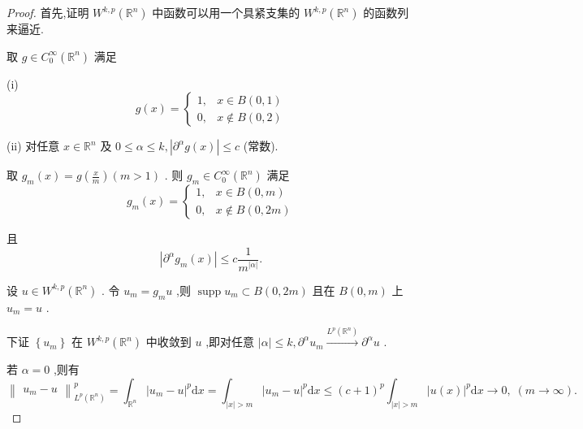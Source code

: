\documentclass[lang=cn,newtx,10pt,scheme=chinese,thmcnt=chapter]{elegantbook}
\newcommand{\dif}{\mathrm{d}}
\begin{document}
\begin{proof}
    首先,证明 \({W}^{k,p}\left( {\mathbb{R}}^{n}\right)\) 中函数可以用一个具紧支集的 \({W}^{k,p}\left( {\mathbb{R}}^{n}\right)\) 的函数列来逼近.

取 \(g \in  {C}_{0}^{\infty }\left( {\mathbb{R}}^{n}\right)\) 满足

(i)
\begin{equation*}
g\left( x\right)  = \left\{  \begin{array}{ll} 1, & x \in  B\left( {0,1}\right) \\  0, & x \notin  B\left( {0,2}\right)  \end{array}\right.
\end{equation*}

(ii) 对任意 \(x \in  {\mathbb{R}}^{n}\) 及 \(0 \leqslant  \alpha  \leqslant  k,\left| {{\partial }^{\alpha }g\left( x\right) }\right|  \leqslant  c\) (常数).

取 \({g}_{m}\left( x\right)  = g\left( \frac{x}{m}\right) \left( {m > 1}\right)\) . 则 \({g}_{m} \in  {C}_{0}^{\infty }\left( {\mathbb{R}}^{n}\right)\) 满足
\begin{equation*}
{g}_{m}\left( x\right)  = \left\{  \begin{array}{ll} 1, & x \in  B\left( {0,m}\right) \\  0, & x \notin  B\left( {0,{2m}}\right)  \end{array}\right.
\end{equation*}

且
\begin{equation*}
\left| {{\partial }^{\alpha }{g}_{m}\left( x\right) }\right|  \leqslant  c\frac{1}{{m}^{\left| \alpha \right| }}.
\end{equation*}

设 \(u \in  {W}^{k,p}\left( {\mathbb{R}}^{n}\right)\) . 令 \({u}_{m} = {g}_{m}u\) ,则 \(\operatorname{supp}{u}_{m} \subset  B\left( {0,{2m}}\right)\) 且在 \(B\left( {0,m}\right)\) 上 \({u}_{m} = u\) .

下证 \(\left\{  {u}_{m}\right\}\) 在 \({W}^{k,p}\left( {\mathbb{R}}^{n}\right)\) 中收敛到 \(u\) ,即对任意 \(\left| \alpha \right|  \leqslant  k,{\partial }^{\alpha }{u}_{m}\overset{{L}^{p}\left( {\mathbb{R}}^{n}\right) }{ \longrightarrow  }{\partial }^{\alpha }u\) .

若 \(\alpha  = 0\) ,则有
\begin{equation*}
{\begin{Vmatrix}{u}_{m} - u\end{Vmatrix}}_{{L}^{p}\left( {\mathbb{R}}^{n}\right) }^{p} = {\int }_{{\mathbb{R}}^{n}}{\left| {u}_{m} - u\right| }^{p}{\dif x} = {\int }_{\left| x\right|  > m}{\left| {u}_{m} - u\right| }^{p}{\dif x}
\leqslant  {\left( c + 1\right) }^{p}{\int }_{\left| x\right|  > m}{\left| u\left( x\right) \right| }^{p}{\dif x} \rightarrow  0,\;\left( {m \rightarrow  \infty }\right) .
\end{equation*}


\end{proof}
\end{document}
